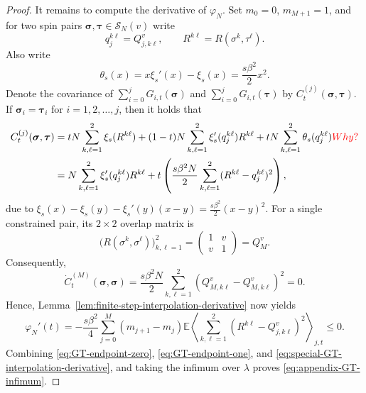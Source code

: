 \documentclass[11pt]{article}
\numberwithin{equation}{section}
\newcommand{\E}{\mathbb{E}}
\newcommand{\1}{\mathbf 1}
\begin{document}
\begin{proof}
It remains to compute the derivative of $\varphi _N$. Set $m_0=0$, $m_{M+1}=1$, and
for two spin pairs $\boldsymbol\sigma,\boldsymbol\tau\in{\mathcal{S}}_N(v)$
write
\[
q_j^{k\ell}=Q_{j,k\ell}^v,
\qquad
R^{k\ell}=R(\sigma^k,\tau^\ell).
\]
Also write
\[
\theta_s(x)=x\xi_s'(x)-\xi_s(x)=\frac{s\beta^2}{2}x^2.
\]
Denote the covariance of $\sum _{i=0}^j G_{i,t} (\boldsymbol\sigma)$ and $\sum _{i=0}^j G_{i,t} (\boldsymbol\tau)$ by $C_t^{(j)}(\boldsymbol\sigma,\boldsymbol\tau)$.
If $\boldsymbol\sigma _i = \boldsymbol\tau _i$ for $i=1,2,\dots ,j$, then it holds that
\begin{align}
C_t^{(j)}(\boldsymbol\sigma,\boldsymbol\tau)&
={}tN\sum_{k,\ell=1}^2\xi_s(R^{k\ell})
+(1-t)N\sum_{k,\ell=1}^2\xi_s'(q_j^{k\ell})R^{k\ell}
 +tN\sum_{k,\ell=1}^2\theta_s(q_j^{k\ell})
\label{eq:GT-split-covariance} {\color{red}Why?}\\
&=N\sum_{k,\ell=1}^2\xi_s'(q_j^{k\ell})R^{k\ell}+ t\left(\frac{s \beta^2 N}{2}\sum_{k,\ell=1}^2(R^{k\ell}-q_j^{k\ell})^2\right),
\end{align}
due to $\xi_s(x)-\xi_s(y)-\xi_s'(y)(x-y)=\frac{s\beta^2}{2}(x-y)^2$. 
For a single constrained pair, its $2\times2$ overlap matrix is
\[
\bigl(R(\sigma^k,\sigma^\ell )\bigr)_{k,\ell =1}^2
=\begin{pmatrix}1&v\\v&1\end{pmatrix}=Q_M^v.
\]
Consequently,
\[
\dot C_t^{(M)}(\boldsymbol\sigma,\boldsymbol\sigma)
=\frac{s\beta^2 N}{2}\sum_{k,\ell=1}^2
(Q_{M,k\ell}^v-Q_{M,k\ell}^v)^2=0.
\]
Hence, Lemma~\ref{lem:finite-step-interpolation-derivative} 
now yields
\begin{equation}
\varphi_N'(t)
=-\frac{s\beta^2}{4}
\sum_{j=0}^M(m_{j+1}-m_j)
\E\left\langle
\sum_{k,\ell=1}^2(R^{k\ell}-Q_{j,k\ell}^v)^2
\right\rangle_{j,t}
\leq0.
\label{eq:special-GT-interpolation-derivative}
\end{equation}
Combining \eqref{eq:GT-endpoint-zero},
\eqref{eq:GT-endpoint-one}, and
\eqref{eq:special-GT-interpolation-derivative}, and taking the infimum over $\lambda$ proves
\eqref{eq:appendix-GT-infimum}.
\end{proof}
\end{document}
